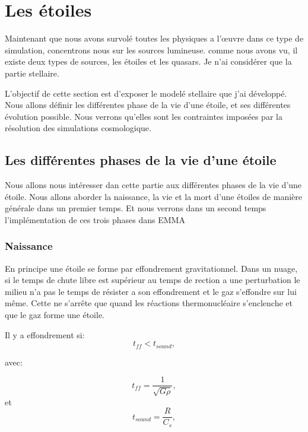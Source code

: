 \chapter{Les étoiles}


Maintenant que nous avons survolé toutes les physiques a l’œuvre dans ce type de simulation, concentrons nous sur les sources lumineuse.
comme nous avons vu, il existe deux types de sources, les étoiles et les quasars. %
Je n'ai considérer que la partie stellaire.

L'objectif de cette section est d'exposer le modelé stellaire que j'ai développé.
Nous allons définir les différentes phase de la vie d'une étoile, et ses différentes évolution possible.
Nous verrons qu'elles sont les contraintes imposées par la résolution des simulations cosmologique.



\section{Les différentes phases de la vie d'une étoile}

Nous allons nous intéresser dan cette partie aux différentes phases de la vie d'une étoile.
Nous allons aborder la naissance, la vie et la mort d'une étoiles de manière générale dans un premier temps.
Et nous verrons dans un second temps l'implémentation de ces trois phases dans EMMA 

\subsection{Naissance}


En principe une étoile se forme par effondrement gravitationnel.
Dans un nuage, si le temps de chute libre est supérieur au temps de rection a une perturbation le milieu n'a pas le temps de résister a son effondrement et le gaz s'effondre sur lui même.
Cette ne s'arrête que quand les réactions thermonucléaire s'enclenche et que le gaz forme une étoile.

Il y a effondrement si:
\begin{equation}
t_{ff} < t_{sound},
\end{equation}

avec:
 
\begin{equation}
t_{ff} = \frac{1}{\sqrt{G \rho}},
\end{equation}
et
\begin{equation}
t_{sound} = \frac{R}{C_s},
\end{equation}

